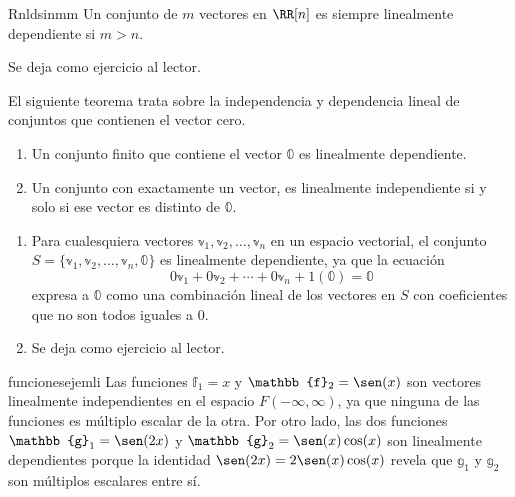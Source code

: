 \begin{theorem}{}{Rnldsinmm}
    Un conjunto de $m$ vectores en $\RR[n]$ es siempre linealmente dependiente si $m > n$.

    \tcblower
    \demostracion Se deja como ejercicio al lector.
\end{theorem}

El siguiente teorema trata sobre la independencia y dependencia lineal de conjuntos que contienen el vector cero.

\begin{theorem}{}{}
    \begin{enumerate}[label=\roman*), topsep=6pt, itemsep=0pt]
        \item Un conjunto finito que contiene el vector $\mathbb{0}$ es linealmente dependiente.
        \item Un conjunto con exactamente un vector, es linealmente independiente si y solo si ese vector es distinto de $\mathbb{0}$.
    \end{enumerate}

    \tcblower
    \demostracion
    \begin{enumerate}[label=\roman*), topsep=6pt, itemsep=0pt]
        \item Para cualesquiera vectores $\mathbb{v}_1, \mathbb{v}_2, \dots, \mathbb{v}_n$ en un espacio vectorial, el conjunto $S = \{\mathbb{v}_1, \mathbb{v}_2, \dots, \mathbb{v}_n, \mathbb{0}\}$ es linealmente dependiente, ya que la ecuación
        $$0\mathbb{v}_1 + 0\mathbb{v}_2 + \cdots + 0\mathbb{v}_n + 1(\mathbb{0}) = \mathbb{0}$$
        expresa a $\mathbb{0}$ como una combinación lineal de los vectores en $S$ con coeficientes que no son todos iguales a $0$.
        \item Se deja como ejercicio al lector.
    \end{enumerate}
\end{theorem}

\begin{examplebox}{}{funcionesejemli}
    Las funciones $\mathbb{f}_1 = x$ y $\mathbb{f}_2 = \sen(x)$ son vectores linealmente independientes en el espacio $F(-\infty, \infty)$, ya que ninguna de las funciones es múltiplo escalar de la otra. Por otro lado, las dos funciones $\mathbb{g}_1 = \sen(2x)$ y $\mathbb{g}_2 = \sen(x) \cos(x)$ son linealmente dependientes porque la identidad $\sen (2x) = 2 \sen(x) \cos(x)$ revela que $\mathbb{g}_1$ y $\mathbb{g}_2$ son múltiplos escalares entre sí.
\end{examplebox}

